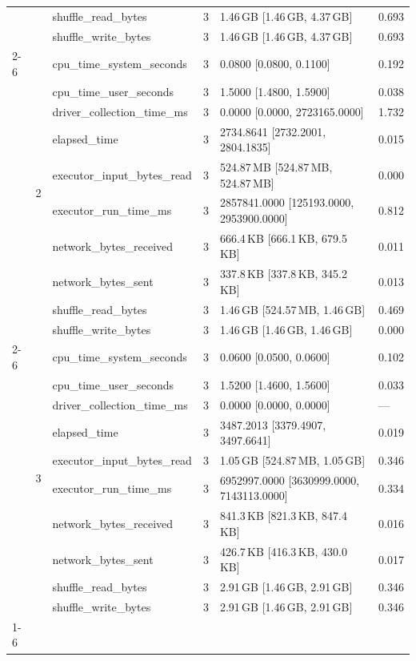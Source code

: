 \begin{tabular}{lllrll}
 &  & shuffle_read_bytes & 3 & 1.46\,GB [1.46\,GB, 4.37\,GB] & 0.693 \\
 &  & shuffle_write_bytes & 3 & 1.46\,GB [1.46\,GB, 4.37\,GB] & 0.693 \\
\cline{2-6}
 & \multirow[t]{10}{*}{2} & cpu_time_system_seconds & 3 & 0.0800 [0.0800, 0.1100] & 0.192 \\
 &  & cpu_time_user_seconds & 3 & 1.5000 [1.4800, 1.5900] & 0.038 \\
 &  & driver_collection_time_ms & 3 & 0.0000 [0.0000, 2723165.0000] & 1.732 \\
 &  & elapsed_time & 3 & 2734.8641 [2732.2001, 2804.1835] & 0.015 \\
 &  & executor_input_bytes_read & 3 & 524.87\,MB [524.87\,MB, 524.87\,MB] & 0.000 \\
 &  & executor_run_time_ms & 3 & 2857841.0000 [125193.0000, 2953900.0000] & 0.812 \\
 &  & network_bytes_received & 3 & 666.4\,KB [666.1\,KB, 679.5\,KB] & 0.011 \\
 &  & network_bytes_sent & 3 & 337.8\,KB [337.8\,KB, 345.2\,KB] & 0.013 \\
 &  & shuffle_read_bytes & 3 & 1.46\,GB [524.57\,MB, 1.46\,GB] & 0.469 \\
 &  & shuffle_write_bytes & 3 & 1.46\,GB [1.46\,GB, 1.46\,GB] & 0.000 \\
\cline{2-6}
 & \multirow[t]{10}{*}{3} & cpu_time_system_seconds & 3 & 0.0600 [0.0500, 0.0600] & 0.102 \\
 &  & cpu_time_user_seconds & 3 & 1.5200 [1.4600, 1.5600] & 0.033 \\
 &  & driver_collection_time_ms & 3 & 0.0000 [0.0000, 0.0000] & --- \\
 &  & elapsed_time & 3 & 3487.2013 [3379.4907, 3497.6641] & 0.019 \\
 &  & executor_input_bytes_read & 3 & 1.05\,GB [524.87\,MB, 1.05\,GB] & 0.346 \\
 &  & executor_run_time_ms & 3 & 6952997.0000 [3630999.0000, 7143113.0000] & 0.334 \\
 &  & network_bytes_received & 3 & 841.3\,KB [821.3\,KB, 847.4\,KB] & 0.016 \\
 &  & network_bytes_sent & 3 & 426.7\,KB [416.3\,KB, 430.0\,KB] & 0.017 \\
 &  & shuffle_read_bytes & 3 & 2.91\,GB [1.46\,GB, 2.91\,GB] & 0.346 \\
 &  & shuffle_write_bytes & 3 & 2.91\,GB [1.46\,GB, 2.91\,GB] & 0.346 \\
\cline{1-6} \cline{2-6}

\end{tabular}
